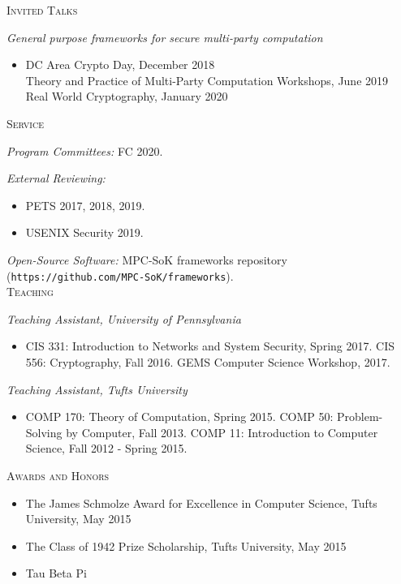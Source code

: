 \documentclass{article}
\begin{document}
\textsc{Invited Talks}

\emph{General purpose frameworks for secure multi-party computation}
\begin{itemize}[label={}, topsep=0pt]
\item DC Area Crypto Day, December 2018 \\
  Theory and Practice of Multi-Party Computation Workshops, June 2019 \\
  Real World Cryptography, January 2020\\
\end{itemize}

\textsc{Service}

\textit{Program Committees:} FC 2020.

\textit{External Reviewing:} 
\begin{itemize}[label={}, noitemsep, topsep=0pt]
\item PETS 2017, 2018, 2019. \item USENIX Security 2019.
\end{itemize}

\textit{Open-Source Software:} MPC-SoK frameworks repository (\texttt{https://github.com/MPC-SoK/frameworks}). \\

\textsc{Teaching}

\textit{Teaching Assistant, University of Pennsylvania} 
\begin{itemize}[label={}, noitemsep, topsep=0pt]
\item CIS 331: Introduction to Networks and System Security, Spring 2017.
CIS 556: Cryptography, Fall 2016.
GEMS Computer Science Workshop, 2017.
\end{itemize}

\textit{Teaching Assistant, Tufts University} 
\begin{itemize}[label={}, noitemsep, topsep=0pt]
\item COMP 170: Theory of Computation, Spring 2015.
COMP 50: Problem-Solving by Computer, Fall 2013.
COMP 11: Introduction to Computer Science, Fall 2012 - Spring 2015. \\
\end{itemize}

\textsc{Awards and Honors}
\begin{itemize}[label={},noitemsep]
\item The James Schmolze Award for Excellence in Computer Science, Tufts University, May 2015
\item The Class of 1942 Prize Scholarship, Tufts University, May 2015
\item Tau Beta Pi
\end{itemize}
\end{document}
